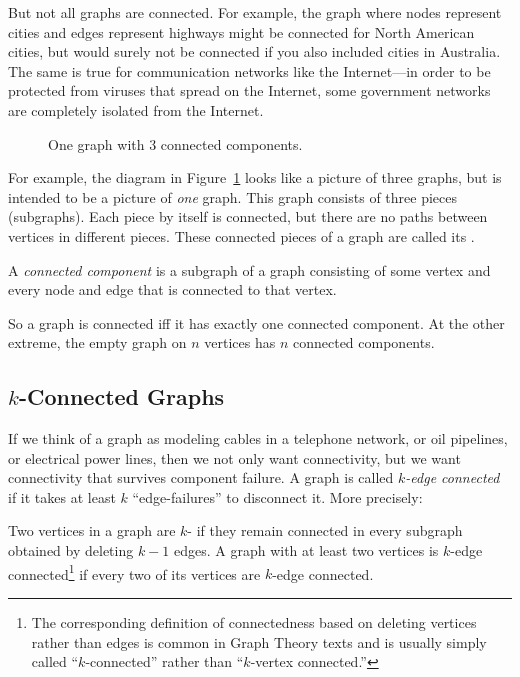 But not all graphs are connected.  For example, the graph where nodes
represent cities and edges represent highways might be connected for
North American cities, but would surely not be connected if you also
included cities in Australia.  The same is true for communication
networks like the Internet---in order to be protected from viruses
that spread on the Internet, some government networks are completely
isolated from the Internet.

\begin{figure}[htbp]


\caption{One graph with 3 connected components.}

\label{fig:3comp}
\end{figure}

For example, the diagram in Figure~\ref{fig:3comp} looks like a
picture of three graphs, but is intended to be a picture of \emph{one}
graph.  This graph consists of three pieces (subgraphs).  Each piece
by itself is connected, but there are no paths between vertices in
different pieces.  These connected pieces of a graph are called its
.

\begin{definition}\label{def:connected-component}
A \emph{connected component} is a subgraph of a graph consisting of
some vertex and every node and edge that is connected to that vertex.
\end{definition}

So a graph is connected iff it has exactly one connected component.
At the other extreme, the empty graph on $n$ vertices has $n$
connected components.

\subsection{$k$-Connected Graphs}

If we think of a graph as modeling cables in a telephone network, or
oil pipelines, or electrical power lines, then we not only want
connectivity, but we want connectivity that survives component
failure.  A graph is called \emph{$k$-edge connected} if it takes at
least $k$ ``edge-failures'' to disconnect it.  More precisely:

\begin{definition}
  Two vertices in a graph are $k$- if they remain
  connected in every subgraph obtained by deleting $k-1$ edges.  A graph
  with at least two vertices is $k$-edge connected\footnote{The
    corresponding definition of connectedness based on deleting vertices
    rather than edges is common in Graph Theory texts and is usually
    simply called ``$k$-connected'' rather than ``$k$-vertex connected.''}
  if every two of its vertices are $k$-edge connected.
\end{definition}

